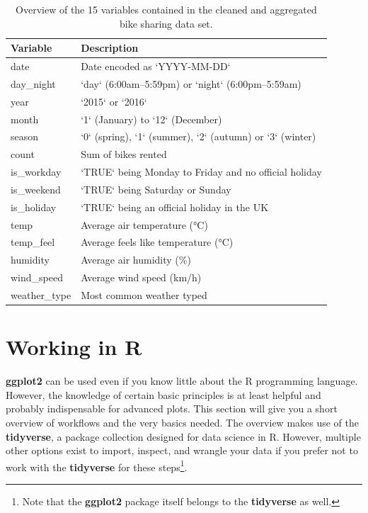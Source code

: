 \documentclass[
]{krantz}
\begin{document}
\begin{longtable}[t]{ll}
\caption{\label{tab:table-bikes-data}Overview of the 15 variables contained in the cleaned and aggregated bike sharing data set.}\\
\toprule
Variable & Description\\
\midrule
date & Date encoded as `YYYY-MM-DD`\\
day\_night & `day` (6:00am–5:59pm) or `night` (6:00pm–5:59am)\\
year & `2015` or `2016`\\
month & `1` (January) to `12` (December)\\
season & `0` (spring), `1` (summer), `2` (autumn) or `3` (winter)\\
\addlinespace
count & Sum of bikes rented\\
is\_workday & `TRUE` being Monday to Friday and no official holiday\\
is\_weekend & `TRUE` being Saturday or Sunday\\
is\_holiday & `TRUE` being an official holiday in the UK\\
temp & Average air temperature (°C)\\
\addlinespace
temp\_feel & Average feels like temperature (°C)\\
humidity & Average air humidity (\%)\\
wind\_speed & Average wind speed (km/h)\\
weather\_type & Most common weather typed\\
\bottomrule
\end{longtable}
\endgroup{}

\hypertarget{rstats}{%
\section{Working in R}\label{rstats}}

\textbf{ggplot2} can be used even if you know little about the R programming language. However, the knowledge of certain basic principles is at least helpful and probably indispensable for advanced plots. This section will give you a short overview of workflows and the very basics needed. The overview makes use of the \textbf{tidyverse}, a package collection designed for data science in R. However, multiple other options exist to import, inspect, and wrangle your data if you prefer not to work with the \textbf{tidyverse} for these steps\footnote{Note that the \textbf{ggplot2} package itself belongs to the \textbf{tidyverse} as well.}.
\end{document}

